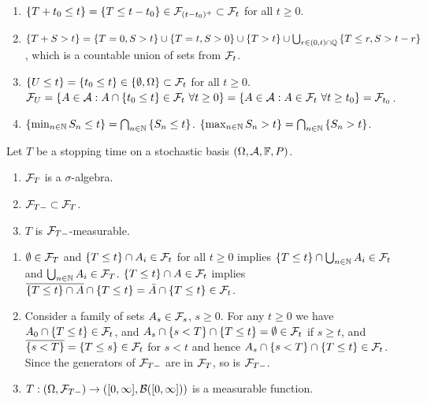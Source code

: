 \solution
\begin{enumerate}
\item $\left\{ T+t_{0}\leq t \right\} = \left\{ T\leq t-t_{0} \right\} \in
    \mathcal F_{(t-t_0)^{+}} \subset \mathcal F_{t}$ for all $t\geq 0$.
\item $\left\{ T+S > t \right\} = \left\{ T=0, S>t \right\} \cup \left\{ T=t,
    S>0 \right\} \cup \left\{ T>t \right\} \cup \bigcup_{r\in(0,t)\cap \mathbb Q}
    \left\{ T\leq r , S> t-r \right\}$, which is a countable union of sets from
    $\mathcal F_{t}$. 
\item $\left\{ U \leq t \right\} = \left\{ t_{0} \leq t \right\} \in \left\{
    \emptyset, \Omega \right\} \subset \mathcal F_{t}$ for all $t\geq 0$. 
    $\mathcal F_U = \left\{ A\in\mathcal A : A \cap \left\{ t_0 \leq t \right\}\in\mathcal F_t \
    \forall t\geq 0 \right\} = \left\{ A\in\mathcal A : A\in\mathcal F_t \ \forall t\geq t_0
    \right\} = \mathcal F_{t_0}$.
\item $\left\{ \min_{n\in\mathbb N} S_{n} \leq t \right\} = \bigcap_{n\in\mathbb N} \left\{
        S_{n}\leq t \right\}$. $\left\{ \max_{n\in\mathbb N} S_n > t \right\} =
        \bigcap_{n\in\mathbb N} \left\{ S_{n} > t \right\}$.
\end{enumerate}

 Let $T$ be a stopping time on a
stochastic basis $(\Omega, \mathcal A, \mathbb F, P)$.
\begin{enumerate}
    \item $\mathcal F_T$ is a $\sigma$-algebra.
    \item $\mathcal F_{T-} \subset \mathcal F_{T}$.
    \item $T$ is $\mathcal F_{T-}$-measurable.
\end{enumerate}

\solution 
\begin{enumerate}
    \item $\emptyset \in \mathcal F_{T}$ and $\left\{ T\leq t \right\} \cap A_{i} \in
        \mathcal F_{t}$ for all $t\geq 0$ implies $\left\{ T\leq t \right\} \cap
        \bigcup_{n\in\mathbb N} A_i \in \mathcal F_t$ and $\bigcup_{n\in\mathbb N} A_i \in
        \mathcal F_{T}$. $\left\{ T \leq t \right\} \cap A \in\mathcal F_t$ implies
        $\overline{ \left\{ T\leq t \right\} \cap A } \cap \left\{ T\leq t
        \right\} = \bar A \cap \left\{ T\leq t \right\} \in \mathcal F_{t}$.
    \item Consider a family of sets $A_{s}\in\mathcal F_{s}$, $s\geq 0$. For any
        $t\geq 0$ we have $A_{0} \cap \left\{ {T\leq t} \right\} \in\mathcal F_{t}$,
        and $A_s \cap \left\{ s<T \right\} \cap \left\{ T\leq t \right\} =
        \emptyset \in\mathcal F_{t}$ if $s\geq t$, and $\overline{ \left\{ s<T
        \right\} } = \left\{ T\leq s \right\} \in \mathcal F_{t}$ for $s<t$ and hence
        $A_s \cap \left\{ s<T \right\} \cap \left\{ T\leq t \right\}
        \in\mathcal F_{t}$. Since the generators of $\mathcal F_{T-}$ are in $\mathcal F_{T}$, so is
        $\mathcal F_{T-}$.
    \item $T : (\Omega, \mathcal F_{T-}) \to ( [0,\infty], \mathcal B([0,\infty]) )$ is a
        measurable function.
\end{enumerate}

